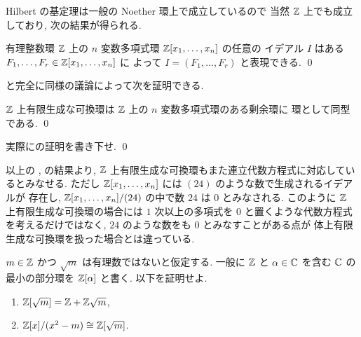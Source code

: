 \documentclass[12pt,twoside]{jarticle}
\begin{document}
Hilbert の基定理は一般の Noether 環上で成立しているので
当然 ${\mathbb Z}$ 上でも成立しており, 次の結果が得られる.

\begin{theorem}
 \label{theorem:Hilbert-basis-theorem/Z}
 有理整数環 ${\mathbb Z}$ 上の $n$ 変数多項式環 ${\mathbb Z}[x_1,\ldots,x_n]$ の任意の
 イデアル $I$ はある $F_1,\ldots,F_r\in{\mathbb Z}[x_1,\ldots,x_n]$ に
 よって $I=(F_1,\ldots,F_r)$ と表現できる.
 \qed
\end{theorem}

と完全に同様の議論によって次を証明できる.

\begin{lemma}
 \label{lemma:R=Z[x1,..,xn]/I}
 ${\mathbb Z}$ 上有限生成な可換環は %
 ${\mathbb Z}$ 上の $n$ 変数多項式環のある剰余環に
 環として同型である. \qed
\end{lemma}

\begin{question}
 実際にの証明を書き下せ. \qed
\end{question}

以上の , 
の結果より, %
${\mathbb Z}$ 上有限生成な可換環もまた連立代数方程式に対応しているとみなせる.
ただし ${\mathbb Z}[x_1,\ldots,x_n]$ には $(24)$ のような数で生成されるイデアルが
存在し, ${\mathbb Z}[x_1,\ldots,x_n]/(24)$ の中で数 $24$ は $0$ とみなされる.
このように ${\mathbb Z}$ 上有限生成な可換環の場合には %
$1$ 次以上の多項式を $0$ と置くような代数方程式を考えるだけではなく, %
$24$ のような数をも $0$ とみなすことがある点が
体上有限生成な可換環を扱った場合とは違っている.

\begin{question}
 $m\in{\mathbb Z}$ かつ $\sqrt{m}$ は有理数ではないと仮定する.
 一般に ${\mathbb Z}$ と $\alpha\in{\mathbb C}$ を含む ${\mathbb C}$ の
 最小の部分環を ${\mathbb Z}[\alpha]$ と書く. 
 以下を証明せよ.
 \begin{enumerate}
  \item ${\mathbb Z}[\sqrt{m}] = {\mathbb Z} + {\mathbb Z}\sqrt{m}$,
  \item ${\mathbb Z}[x]/(x^2-m)\cong {\mathbb Z}[\sqrt{m}]$.
 \end{enumerate}
\end{question}
\end{document}
